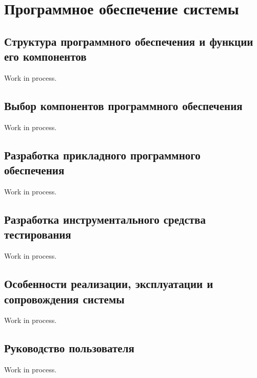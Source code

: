 \section{Программное обеспечение системы}

\subsection{Структура программного обеспечения и функции его компонентов}

Work in process.

\subsection{Выбор компонентов программного обеспечения}

Work in process.

\subsection{Разработка прикладного программного обеспечения}

Work in process.

\subsection{Разработка инструментального средства тестирования}

Work in process.

\subsection{Особенности реализации, эксплуатации и сопровождения системы}

Work in process.

\subsection{Руководство пользователя}

Work in process.

\clearpage
\newpage